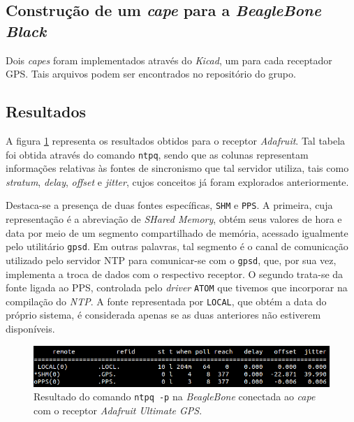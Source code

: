 \FloatBarrier
 
\subsection{Construção de um \textit{cape} para a \textit{BeagleBone Black}}

Dois \textit{capes} foram implementados através do \textit{Kicad}, um para cada
receptador GPS. Tais arquivos podem ser encontrados no repositório do grupo.


\subsection{Resultados}

A figura \ref{img:adafruit} representa os resultados obtidos para o receptor
\textit{Adafruit}. Tal tabela foi obtida através do comando \texttt{ntpq}, sendo
que as colunas representam informações relativas às fontes de sincronismo que
tal servidor utiliza, tais como \textit{stratum}, \textit{delay},
\textit{offset} e \textit{jitter}, cujos conceitos já foram explorados
anteriormente.

\vspace{12pt}

Destaca-se a presença de duas fontes específicas, \texttt{SHM} e \texttt{PPS}.
A primeira, cuja representação é a abreviação de \textit{SHared Memory}, obtém
seus valores de hora e data por meio de um segmento compartilhado de memória,
acessado igualmente pelo utilitário \texttt{gpsd}. Em outras palavras, tal
segmento é o canal de comunicação utilizado pelo servidor NTP para comunicar-se
com o \texttt{gpsd}, que, por sua vez, implementa a troca de dados com o
respectivo receptor. O segundo trata-se da fonte ligada ao PPS, controlada pelo
\textit{driver} \texttt{ATOM} que tivemos que incorporar na compilação do
\textit{NTP}. A fonte representada por \texttt{LOCAL}, que obtém a data do
próprio sistema, é considerada apenas se as duas anteriores não estiverem
disponíveis.

\FloatBarrier

\begin{figure}[h]
    
    \centering
    \includegraphics[scale=0.6]{image/adafruit_GPS}
    \caption {Resultado do comando \texttt{ntpq -p} na
    \textit{BeagleBone} conectada ao \textit{cape} com o receptor \textit{Adafruit Ultimate GPS}.}
    \label{img:adafruit} 
\end{figure} 

